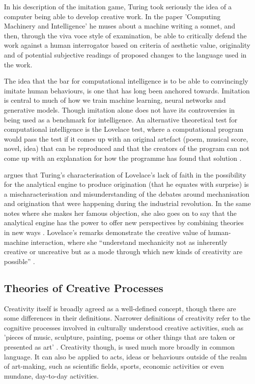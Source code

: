 In his description of the imitation game, Turing took seriously the idea of a computer being able to develop creative work. 
In the paper 'Computing Machinery and Intelligence' he muses about a machine writing a sonnet, and then, through the viva voce style of examination, be able to critically defend the work against a human interrogator based on criteria of aesthetic value, originality and of potential subjective readings of proposed changes to the language used in the work.

The idea that the bar for computational intelligence is to be able to convincingly imitate human behaviours, is one that has long been anchored towards. 
Imitation is central to much of how we train machine learning, neural networks and generative models. 
Though imitation alone does not have its controversies in being used as a benchmark for intelligence. 
An alternative theoretical test for computational intelligence is the Lovelace test, where a computational program would pass the test if it comes up with an original artefact (poem, musical score, novel, idea) that can be reproduced and that the creators of the program can not come up with an explanation for how the programme has found that solution \citep{bringsjord2003creativity}. 

\cite{ward2020computational} argues that Turing's characterisation of Lovelace's lack of faith in the possibility for the analytical engine to produce origination (that he equates with surprise) is a mischaracterisation and misunderstanding of the debates around mechanisation and origination that were happening during the industrial revolution. 
In the same notes where she makes her famous objection, she also goes on to say that the analytical engine has the power to offer new perspectives by combining theories in new ways \citep{lovelace1843notes}.
 Lovelace's remarks demonstrate the creative value of human-machine interaction, where she ``understand mechanicity not as inherently creative or uncreative but as a mode through which new kinds of creativity are possible'' \citep{ward2020computational}.

\subsection{Theories of Creative Processes}

Creativity itself is broadly agreed as a well-defined concept, though there are some differences in their definitions. 
Narrower definitions of creativity refer to the cognitive processes involved in culturally understood creative activities, such as 'pieces of music, sculpture, painting, poems or other things that are taken or presented as art' \citep{wiggins2015evolutionary}.
Creativity though, is used much more broadly in common language. 
It can also be applied to acts, ideas or behaviours outside of the realm of art-making, such as scientific fields, sports, economic activities or even mundane, day-to-day activities.


